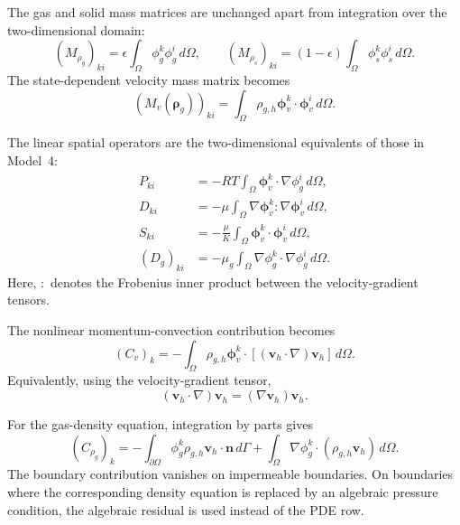The gas and solid mass matrices are unchanged apart from integration over the two-dimensional domain:
\begin{equation}
(M_{\rho_g})_{ki}
=\epsilon\int_\Omega\phi_g^k\phi_g^i\,d\Omega,\qquad
(M_{\rho_s})_{ki}
=(1-\epsilon)\int_\Omega\phi_s^k\phi_s^i\,d\Omega.
\end{equation}
The state-dependent velocity mass matrix becomes
\begin{equation}\label{eq:model5_Mv}
\left(M_v(\boldsymbol\rho_g)\right)_{ki}
=\int_\Omega\rho_{g,h}\boldsymbol\phi_v^k\cdot\boldsymbol\phi_v^i\,d\Omega.
\end{equation}

The linear spatial operators are the two-dimensional equivalents of those in Model~4:
\begin{align}
P_{ki}
&=-RT\int_\Omega\boldsymbol\phi_v^k\cdot\nabla\phi_g^i\,d\Omega,\\
D_{ki}
&=-\mu\int_\Omega\nabla\boldsymbol\phi_v^k:\nabla\boldsymbol\phi_v^i\,d\Omega,\\
S_{ki}
&=-\frac{\mu}{K}\int_\Omega\boldsymbol\phi_v^k\cdot\boldsymbol\phi_v^i\,d\Omega,\\
 (D_g)_{ki}
&=-\mu_g\int_\Omega\nabla\phi_g^k\cdot\nabla\phi_g^i\,d\Omega.
\end{align}
Here, $:$ denotes the Frobenius inner product between the velocity-gradient tensors.

The nonlinear momentum-convection contribution becomes
\begin{equation}\label{eq:model5_Cv}
 (C_v)_{k}
=-\int_\Omega\rho_{g,h}\boldsymbol\phi_v^k\cdot
\left[(\mathbf v_h\cdot\nabla)\mathbf v_h\right]\,d\Omega.
\end{equation}
Equivalently, using the velocity-gradient tensor,
\begin{equation}
(\mathbf v_h\cdot\nabla)\mathbf v_h
=(\nabla\mathbf v_h)\mathbf v_h.
\end{equation}

For the gas-density equation, integration by parts gives
\begin{equation}\label{eq:model5_Crho}
 (C_{\rho_g})_{k}
=-\int_{\partial\Omega}\phi_g^k\rho_{g,h}\mathbf v_h\cdot\mathbf n\,d\Gamma
+\int_\Omega\nabla\phi_g^k\cdot(\rho_{g,h}\mathbf v_h)\,d\Omega.
\end{equation}
The boundary contribution vanishes on impermeable boundaries. On boundaries where the corresponding density equation is replaced by an algebraic pressure condition, the algebraic residual is used instead of the PDE row.

